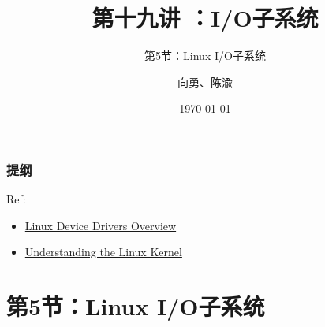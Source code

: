 


\title[第19讲]{第十九讲 ：I/O子系统} %
\subtitle{第5节：Linux I/O子系统}
\author{向勇、陈渝} %
\date{\today} %



\begin{frame}
\titlepage %
\end{frame}

\begin{frame}
\frametitle{提纲} %
\tableofcontents %

Ref:
    \begin{itemize}
        \item \href{http://osq.cs.berkeley.edu/public/JFoster-Drivers.ppt}{Linux Device Drivers Overview}
        \item \href{http://ermak.cs.nstu.ru/understanding.linux.kernel.pdf}{Understanding the Linux Kernel}
    \end{itemize}

\end{frame}
\section{第5节：Linux I/O子系统} %
